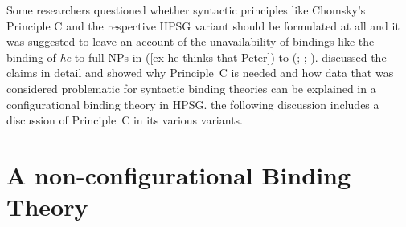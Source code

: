 \documentclass[output=paper
 	        ,biblatex
                ,babelshorthands
                ,newtxmath
                ,draftmode
                ,colorlinks, citecolor=brown
]{langscibook}
\begin{document}
Some researchers questioned whether syntactic principles like Chomsky's Principle C and the
respective HPSG variant should be formulated at all and it was suggested to leave an account of the
unavailability of bindings like the binding of \emph{he} to full NPs in
(\ref{ex-he-thinks-that-Peter}) to  (\citealp[]{Bolinger79a-u}; \citealp[--228]{Bresnan2001a};
\citealp*[]{BMS2001a}). \citet[Section~6]{Walker2011a} discussed the claims in detail
and showed why Principle~C is needed and how data that was considered problematic for syntactic
binding theories can be explained in a configurational binding theory in HPSG.  the following
discussion includes a discussion of Principle~C in its various variants.

\section{A non-configurational Binding Theory}
\label{binding:sec-a-non-configurational-binding-theory}
\end{document}
